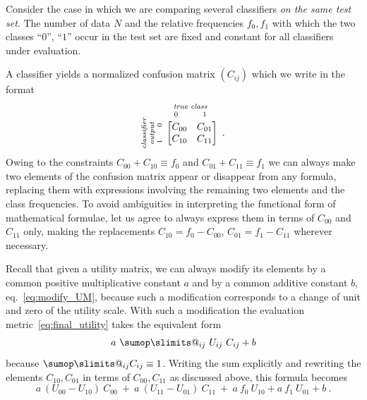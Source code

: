 \documentclass[\ifafour a4paper,12pt,\else a5paper,10pt,\fi%
onecolumn,oneside,article,%
british%
]{memoir}
\makeatletter
\theoremstyle{remark}
\theoremstyle{innote}
\def\sum{\DOTSI\sumop\slimits@}
\renewcommand*{\|}[1][]{\nonscript\:#1\vert\nonscript\:\mathopen{}}
\newcommand*{\eqn}{eq.}%
\makeatother
\begin{document}
Consider the case in which we are comparing several classifiers \emph{on the same test set}. The number of data $N$ and the relative frequencies $f_{0}, f_{1}$ with which the two classes \enquote{$0$}, \enquote{$1$} occur in the test set are fixed and constant for all classifiers under evaluation.

A classifier yields a normalized confusion matrix $(C_{ij})$ which we write in the format
\begin{equation*}
  \rotatebox[origin=c]{90}{
    \clap{\textit{\parbox{5em}{\centering\scriptsize classifier\\output\\$1\hspace{1.5em}0$}}
    }}\ 
    \overbracket[0pt]{
      \begin{bmatrix} C_{00} & C_{01} \\ C_{10} & C_{11}
      \end{bmatrix}}^{
      \clap{\textit{\parbox{6em}{\centering\scriptsize true class\\$0\hspace{3em}1$}}
    }} \ .
\end{equation*}

Owing to the constraints $C_{00} + C_{10} \equiv f_{0}$ and $C_{01} + C_{11} \equiv f_{1}$ we can always make two elements of the confusion matrix appear or disappear from any formula, replacing them with expressions involving the remaining two elements and the class frequencies. To avoid ambiguities in interpreting the functional form of mathematical formulae, let us agree to always express them in terms of $C_{00}$ and $C_{11}$ only, making the replacements $C_{10} = f_{0} - C_{00}$, $C_{01} = f_{1} - C_{11}$ wherever necessary.

Recall that given a utility matrix, we can always modify its elements by a common positive multiplicative constant $a$ and by a common additive constant $b$, \eqn~\eqref{eq:modify_UM}, because such a modification corresponds to a change of unit and zero of the utility scale. With such a modification the evaluation metric~\eqref{eq:final_utility} takes the equivalent form
\begin{equation}
  \label{eq:final_utility_modified}
 a\ \sum_{ij} \ U_{ij}\ C_{ij} + b
\end{equation}
because $\sum_{ij} C_{ij} \equiv 1$. Writing the sum explicitly and rewriting the elements $C_{10}, C_{01}$ in terms of $C_{00}, C_{11}$ as discussed above, this formula becomes 
\begin{equation}
  \label{eq:final_utility_binary}
    a\ (U_{00} - U_{10})\ C_{00} \ + \ 
    a\ (U_{11} - U_{01})\ C_{11} \ + \ 
    a\ f_{0}\ U_{10} + a\ f_{1}\ U_{01} +  b \ .
\end{equation}
\end{document}
